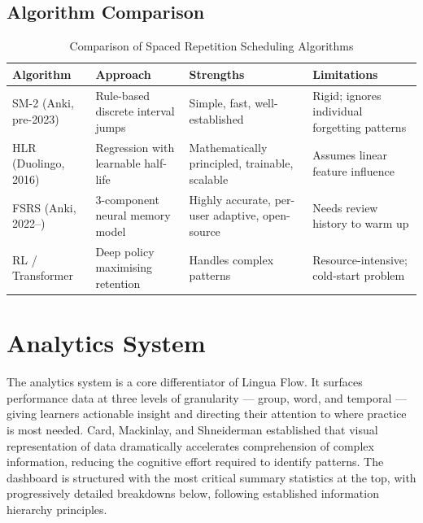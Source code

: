 \documentclass[10pt,a4paper]{article}
\begin{document}
\subsection{Algorithm Comparison}
\begin{table}[H]
    \centering\small\color{darkgreen}
    \caption{Comparison of Spaced Repetition Scheduling Algorithms}
    \begin{tabularx}{\textwidth}{l X X X}
        \toprule
        \bfseries Algorithm & \bfseries Approach & \bfseries Strengths & \bfseries Limitations \\
        \midrule
        SM-2 (Anki, pre-2023) & Rule-based discrete interval jumps & Simple, fast, well-established & Rigid; ignores individual forgetting patterns \\
        \addlinespace
        HLR (Duolingo, 2016) \cite{settles2016trainable} & Regression with learnable half-life & Mathematically principled, trainable, scalable & Assumes linear feature influence \\
        \addlinespace
        FSRS (Anki, 2022--) \cite{ye2022fsrs} & 3-component neural memory model & Highly accurate, per-user adaptive, open-source & Needs review history to warm up \\
        \addlinespace
        RL / Transformer & Deep policy maximising retention & Handles complex patterns & Resource-intensive; cold-start problem \\
        \bottomrule
    \end{tabularx}
\end{table}

\section{Analytics System}
The analytics system is a core differentiator of Lingua Flow. It surfaces performance data at three levels of granularity --- group, word, and temporal --- giving learners actionable insight and directing their attention to where practice is most needed. Card, Mackinlay, and Shneiderman \cite{card1999readings} established that visual representation of data dramatically accelerates comprehension of complex information, reducing the cognitive effort required to identify patterns. The dashboard is structured with the most critical summary statistics at the top, with progressively detailed breakdowns below, following established information hierarchy principles.
\end{document}
